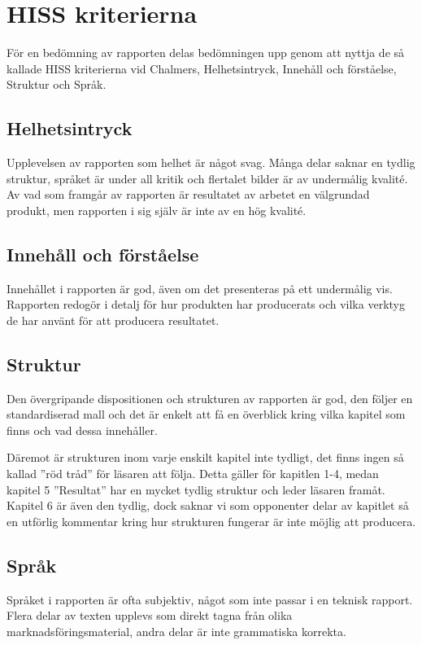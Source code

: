 \section{HISS kriterierna} %
\label{sec:hiss}
    För en bedömning av rapporten delas bedömningen upp genom att nyttja de så kallade HISS kriterierna vid Chalmers, Helhetsintryck, Innehåll och förståelse, Struktur och Språk.

    \subsection{Helhetsintryck} %
    \label{sub:helhetsintryck}
        Upplevelsen av rapporten som helhet är något svag. Många delar saknar en tydlig struktur, språket är under all kritik och flertalet bilder är av undermålig kvalité. Av vad som framgår av rapporten är resultatet av arbetet en välgrundad produkt, men rapporten i sig själv är inte av en hög kvalité.

    \subsection{Innehåll och förståelse} %
    \label{sub:innehall}
        Innehållet i rapporten är god, även om det presenteras på ett undermålig vis. Rapporten redogör i detalj för hur produkten har producerats och vilka verktyg de har använt för att producera resultatet.

    \subsection{Struktur} %
    \label{sub:sturktur}
        Den övergripande dispositionen och strukturen av rapporten är god, den följer en standardiserad mall och det är enkelt att få en överblick kring vilka kapitel som finns och vad dessa innehåller. \bigskip

        Däremot är strukturen inom varje enskilt kapitel inte tydligt, det finns ingen så kallad ''röd tråd'' för läsaren att följa. Detta gäller för kapitlen 1-4, medan kapitel 5 ''Resultat'' har en mycket tydlig struktur och leder läsaren framåt. Kapitel 6 är även den tydlig, dock saknar vi som opponenter delar av kapitlet så en utförlig kommentar kring hur strukturen fungerar är inte möjlig att producera.

    \subsection{Språk} %
    \label{sub:spr_k}
        Språket i rapporten är ofta subjektiv, något som inte passar i en teknisk rapport. Flera delar av texten upplevs som direkt tagna från olika marknadsföringsmaterial, andra delar är inte grammatiska korrekta.
    

